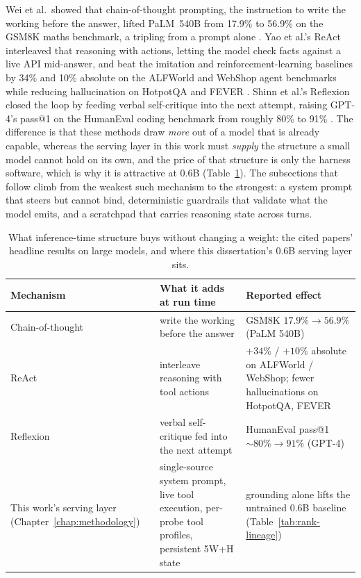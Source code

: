 Wei et al.\ showed that chain-of-thought prompting, the instruction to write the working before the answer, lifted PaLM~540B from 17.9\% to 56.9\% on the GSM8K maths benchmark, a tripling from a prompt alone \cite{wei2023chainofthoughtpromptingelicitsreasoning}. Yao et al.'s ReAct interleaved that reasoning with actions, letting the model check facts against a live API mid-answer, and beat the imitation and reinforcement-learning baselines by 34\% and 10\% absolute on the ALFWorld and WebShop agent benchmarks while reducing hallucination on HotpotQA and FEVER \cite{yao2023reactsynergizingreasoningacting}. Shinn et al.'s Reflexion closed the loop by feeding verbal self-critique into the next attempt, raising GPT-4's pass@1 on the HumanEval coding benchmark from roughly 80\% to 91\% \cite{shinn2023reflexionlanguageagentsverbal}. The difference is that these methods draw \emph{more} out of a model that is already capable, whereas the serving layer in this work must \emph{supply} the structure a small model cannot hold on its own, and the price of that structure is only the harness software, which is why it is attractive at 0.6B (Table~\ref{tab:inference-steering}). The subsections that follow climb from the weakest such mechanism to the strongest: a system prompt that steers but cannot bind, deterministic guardrails that validate what the model emits, and a scratchpad that carries reasoning state across turns.

\begin{table}[t]
  \centering
  \caption{What inference-time structure buys without changing a weight: the cited papers' headline results on large models, and where this dissertation's 0.6B serving layer sits.}
  \label{tab:inference-steering}
  \begin{tabular}{p{3.2cm}p{4.6cm}p{5.6cm}}
    \hline
    Mechanism & What it adds at run time & Reported effect \\
    \hline
    Chain-of-thought \cite{wei2023chainofthoughtpromptingelicitsreasoning} &
      write the working before the answer & GSM8K $17.9\% \to 56.9\%$ (PaLM 540B) \\
    ReAct \cite{yao2023reactsynergizingreasoningacting} &
      interleave reasoning with tool actions & $+34\%$ / $+10\%$ absolute on
      ALFWorld / WebShop; fewer hallucinations on HotpotQA, FEVER \\
    Reflexion \cite{shinn2023reflexionlanguageagentsverbal} &
      verbal self-critique fed into the next attempt & HumanEval pass@1
      $\sim\!80\% \to 91\%$ (GPT-4) \\
    This work's serving layer (Chapter~\ref{chap:methodology}) &
      single-source system prompt, live tool execution, per-probe tool profiles,
      persistent 5W+H state & grounding alone lifts the untrained 0.6B baseline
      (Table~\ref{tab:rank-lineage}) \\
    \hline
  \end{tabular}
\end{table}

